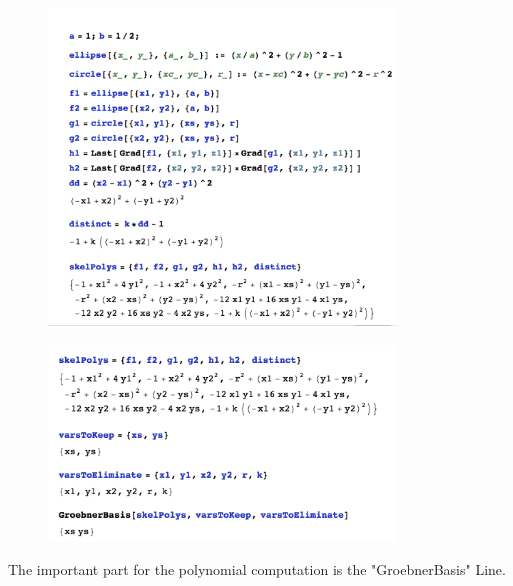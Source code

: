 \documentclass{beamer}
\begin{document}
	
	\begin{frame}
		
		\begin{figure}
			\centering
			\includegraphics[width=0.825\textwidth]{../Code/Images/code_skeleton.png}
		\end{figure}
		
	\end{frame}
	
	\begin{frame}
		\begin{figure}
			\centering
			\includegraphics[width=0.825\textwidth]{../Code/Images/code_skeleton_3.png}
		\end{figure}
		
		\vspace{0.2 in}
		
		The important part for the polynomial computation is the "GroebnerBasis" Line.

	\end{frame}
	
\end{document}

